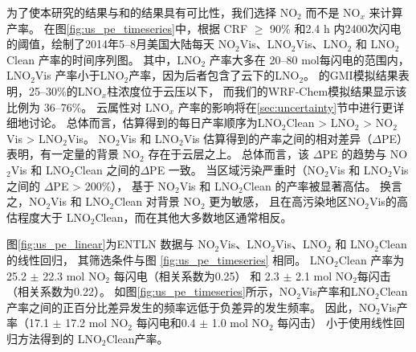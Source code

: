 为了使本研究的结果与\citet{Pickering.2016}和\citet{Lapierre.2020}的结果具有可比性，我们选择 NO$_2$  而不是 NO$_x$  来计算产率。
在图\ref{fig:us_pe_timeseries}中，根据 CRF $\geq$ 90\% 和2.4 h 内2400次闪电的阈值，绘制了2014年5--8月美国大陆每天 NO$_2$Vis、LNO$_2$Vis、LNO$_2$ 和 LNO$_2$Clean 产率的时间序列图。
其中，LNO$_2$ 产率大多在 20--80 mol每闪电的范围内，LNO$_2$Vis 产率小于LNO$_2$产率，因为后者包含了云下的LNO$_2$。
\citet{Pickering.2016}的GMI模拟结果表明，25--30\%的LNO$_x$柱浓度位于云压以下，
而我们的WRF-Chem模拟结果显示该比例为 36--76\%。
云属性对 LNO$_x$ 产率的影响将在\ref{sec:uncertainty}节中进行更详细地讨论。
总体而言，估算得到的每日产率顺序为LNO$_2$Clean > LNO$_2$ > NO$_2$Vis > LNO$_2$Vis。
NO$_2$Vis 和 LNO$_2$Vis 估算得到的产率之间的相对差异（$\Delta$PE）表明，有一定量的背景 NO$_2$ 存在于云层之上。
总体而言，该 $\Delta$PE 的趋势与 NO$_2$Vis 和 LNO$_2$Clean 之间的$\Delta$PE 一致。
当区域污染严重时（NO$_2$Vis 和 LNO$_2$Vis 之间的 $\Delta$PE > 200\%），
基于 NO$_2$Vis 和 LNO$_2$Clean 的产率被显著高估。
换言之，NO$_2$Vis 和 LNO$_2$Clean 对背景 NO$_2$ 更为敏感，
且在高污染地区NO$_2$Vis的高估程度大于 LNO$_2$Clean，而在其他大多数地区通常相反。

图\ref{fig:us_pe_linear}为ENTLN 数据与 NO$_2$Vis、LNO$_2$Vis、LNO$_2$ 和 LNO$_2$Clean的线性回归，
其筛选条件与图 \ref{fig:us_pe_timeseries} 相同。
LNO$_2$Clean 产率为 25.2 $\pm$ 22.3 mol NO$_2$ 每闪电（相关系数为0.25）
和 2.3 $\pm$ 2.1 mol NO$_2$每闪击（相关系数为0.22）。
如图\ref{fig:us_pe_timeseries}所示，NO$_2$Vis产率和LNO$_2$Clean产率之间的正百分比差异发生的频率远低于负差异的发生频率。
因此，NO$_2$Vis产率（17.1 $\pm$ 17.2 mol NO$_2$ 每闪电和0.4 $\pm$ 1.0 mol NO$_2$ 每闪击）
小于使用线性回归方法得到的 LNO$_2$Clean产率。


